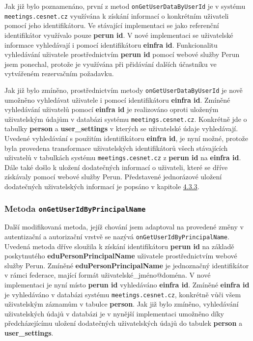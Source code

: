 \documentclass[
  printed, %
  twoside, %
  table,   %
  nolof,     %
  nolot,     %
]{fithesis3}
\begin{document}
Jak již bylo poznamenáno, první z metod \texttt{onGetUserDataByUserId} je v systému \texttt{meetings.cesnet.cz} využívána k získání informací o konkrétním uživateli pomocí jeho identifikátoru. Ve stávající implementaci se jako referenční identifikátor využívalo pouze \textbf{perun id}. V nové implementaci se uživatelské informace vyhledávají i pomocí identifikátoru \textbf{einfra id}. Funkcionalitu vyhledávání uživatele prostřednictvím \textbf{perun id} pomocí webové služby Perun jsem ponechal, protože je využívána při přidávání dalších účastníku ve vytvářeném rezervačním požadavku. 

\par 

Jak již bylo zmíněno, prostřednictvím metody \texttt{onGetUserDataByUserId} je nově umožněno vyhledávat uživatele i pomocí identifikátoru \textbf{einfra id}. Zmíněné vyhledávání uživatelů pomocí \textbf{einfra id} je realizováno oproti uloženým uživatelským údajům v databázi systému \texttt{meetings.cesnet.cz}. Konkrétně jde o tabulky \textbf{person} a \textbf{user\_settings} v kterých se uživatelské údaje vyhledávají. Uvedené vyhledávání s použitím identifikátoru \textbf{einfra id}, je nyní možné, protože byla provedena transformace uživatelských identifikátorů všech stávajících uživatelů v tabulkách systému \texttt{meetings.cesnet.cz} z \textbf{perun id} na \textbf{einfra id}. Dále také došlo k uložení dodatečných informací o uživateli, které se dříve získávaly pomocí webové služby Perun. Představené jednorázové uložení dodatečných uživatelských informací je popsáno v kapitole \hyperref[zpracovaniAUlozeniPerun]{4.3.3}. 
\subsubsection{Metoda \texttt{onGetUserIdByPrincipalName}}

Další modifikovaná metoda, jejíž chování jsem adaptoval na provedené změny v autentizační a autorizační vrstvě se nazývá \texttt{onGetUserIdByPrincipalName}. Uvedená metoda dříve sloužila k získání identifikátoru \textbf{perun id} na základě poskytnutého \textbf{eduPersonPrincipalName} uživatele prostřednictvím webové služby Perun. Zmíněné \textbf{eduPersonPrincipalName} je jednoznačný identifikátor v rámci federace, mající formát uživatelské\_jméno@doména. V nové implementaci je nyní místo \textbf{perun id} vyhledáváno \textbf{einfra id}. Zmíněné \textbf{einfra id} je vyhledáváno v databázi systému \texttt{meetings.cesnet.cz}, konkrétně vůči všem uživatelským záznamům v tabulce \textbf{person}. Jak již bylo zmíněno, vyhledávání uživatelských údajů v databázi je v nynější implementaci umožněno díky předcházejícímu uložení dodatečných uživatelských údajů do tabulek \textbf{person} a \textbf{user\_settings}.
\end{document}
